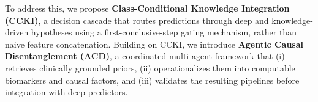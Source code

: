\documentclass[runningheads]{llncs}
\begin{document}
To address this, we propose \textbf{Class-Conditional Knowledge Integration (CCKI)}, a decision cascade that routes predictions through deep and knowledge-driven hypotheses using a first-conclusive-step gating mechanism, rather than naive feature concatenation. Building on CCKI, we introduce \textbf{Agentic Causal Disentanglement (ACD)}, a coordinated multi-agent framework that (i) retrieves clinically grounded priors, (ii) operationalizes them into computable biomarkers and causal factors, and (iii) validates the resulting pipelines before integration with deep predictors.  



% 
\end{document}
